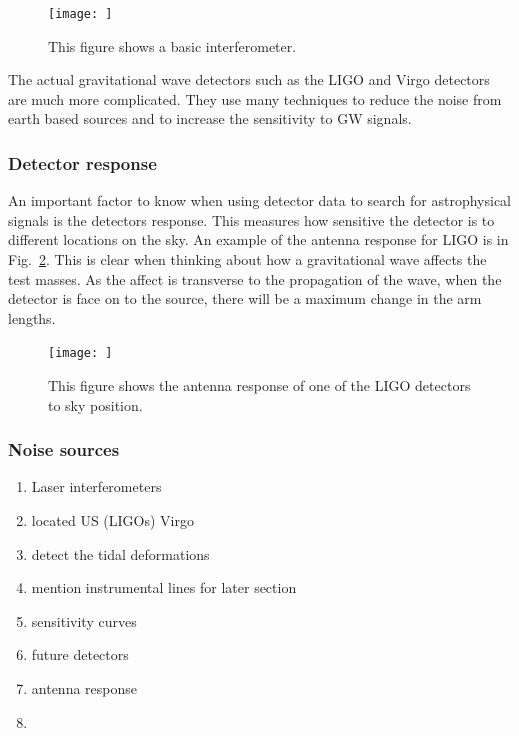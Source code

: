 \begin{figure}
    \centering
    \texttt{[image: ]}
    \caption{This figure shows a basic interferometer.}
    \label{detectors:interfereometer}
\end{figure}

The actual gravitational wave detectors such as the \ac{LIGO} \citep{} and Virgo \citep{} detectors are much more complicated.
They use many techniques to reduce the noise from earth based sources and to increase the sensitivity to \ac{GW} signals.


\subsubsection{Detector response}

An important factor to know when using detector data to search for astrophysical signals is the detectors response.
This measures how sensitive the detector is to different locations on the sky.
An example of the antenna response for \ac{LIGO} is in Fig.~\ref{detectors:response}.
This is clear when thinking about how a gravitational wave affects the test masses. 
As the affect is transverse to the propagation of the wave, when the detector is face on to the source, there will be a maximum change in the arm lengths.

\begin{figure}
    \centering
    \texttt{[image: ]}
    \caption{This figure shows the antenna response of one of the \ac{LIGO} detectors to sky position.}
    \label{detectors:response}
\end{figure}

\subsubsection{Noise sources}
\begin{enumerate}
    \item Laser interferometers
    \item located US (LIGOs) Virgo
    \item detect the tidal deformations 
    \item mention instrumental lines for later section
    \item sensitivity curves
    \item future detectors
    \item antenna response
    \item 
\end{enumerate}

